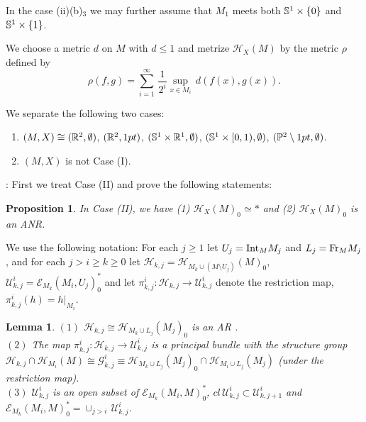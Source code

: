 \documentclass[11pt]{amsart}
\newtheorem{proposition}{Proposition}[section]
\newtheorem{lemma}{Lemma}[section]
\theoremstyle{definition}
\newtheorem*{Proof of Theorem 3.1}{Proof of Theorem 3.1}
\newtheorem*{Proof of Corollary 3.1}{Proof of Corollary 3.1}
\newtheorem*{Proof of Proposition 4.1.(1)}{Proof of Proposition 4.1.(1)}
\newtheorem*{Proof of Proposition 4.1.(2)}{Proof of Proposition 4.1.(2)}
\newtheorem*{Proof of Corollary 1.1}{Proof of Corollary 1.1}
\def \cal {\mathcal}
\begin{document}
In the case (ii)(b)$_3$ we may further assume that $M_1$ meets both ${\Bbb S}^1 \times \{ 0 \}$ and ${\Bbb S}^1 \times \{ 1 \}$. 

We choose a metric $d$ on $M$ with $d \leq 1$ and metrize ${\cal H}_X(M)$ by the metric $\rho$ defined by
\[ \rho(f, g) = \sum_{i=1}^{\infty} \, \frac{1}{2^i} \sup_{x \in M_i} \, d(f(x), g(x)). \]

We separate the following two cases: 

\renewcommand{\labelenumi}{(\bf\Roman{enumi})}

\begin{enumerate}
\item $(M, X) \cong ({\Bbb R}^2, \emptyset)$, $({\Bbb R}^2, 1pt)$, $({\Bbb S}^1 \times {\Bbb R}^1, \emptyset)$, $({\Bbb S}^1 \times [0, 1), \emptyset)$, $({\Bbb P}^2 \setminus 1pt, \emptyset)$. 
\item $(M, X)$ is not Case (I).
\end{enumerate}
\vskip 2mm
: First we treat Case (II) and prove the following statements: 

\begin{proposition}
In Case {\rm (II)}, we have {\rm (1)} ${\cal H}_X(M)_0 \simeq \ast$ and {\rm (2)} ${\cal H}_X(M)_0$ is an ANR.
\end{proposition}

We use the following notation: For each $j \geq 1$ let $U_j = {\rm Int}_M M_j$ and $L_j = {\rm Fr}_M M_j$, and for each $j > i \geq k \geq 0$ let ${\cal H}_{k,j} = {\cal H}_{M_k \cup (M \setminus U_j)}(M)_0$, ${\cal U}^i_{k,j} = {\cal E}_{M_k}(M_i, U_j)^{\ast}_0$ and let $\pi^i_{k,j} : {\cal H}_{k,j} \to {\cal U}^i_{k,j}$ denote the restriction map, $\pi^i_{k,j}(h) = h|_{M_i}$. 

\begin{lemma}
$(1)$ ${\cal H}_{k,j} \cong {\cal H}_{M_k \cup L_j}(M_j)_0$ is an AR . \\
$(2)$ The map $\pi^i_{k,j} : {\cal H}_{k,j} \to {\cal U}^i_{k,j}$ is a principal bundle with the structure group ${\cal H}_{k,j} \cap {\cal H}_{M_i}(M) \cong {\cal G}^i_{k,j} \equiv {\cal H}_{M_k \cup L_j}(M_j)_0 \cap {\cal H}_{M_i \cup L_j}(M_j)$ (under the restriction map).
\\
$(3)$ ${\cal U}^i_{k,j}$ is an open subset of ${\cal E}_{M_k}(M_i, M)^{\ast}_0$, $cl \, {\cal U}^i_{k,j} \subset {\cal U}^i_{k,j+1}$ and ${\cal E}_{M_k}(M_i, M)^{\ast}_0 = \cup_{j > i} \, {\cal U}^i_{k,j}$. 
\end{lemma}
\end{document}
